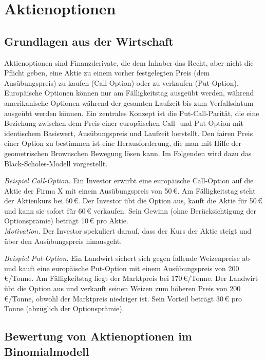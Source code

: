 \section{Aktienoptionen}

\subsection{Grundlagen aus der Wirtschaft}

Aktienoptionen sind Finanzderivate, die dem Inhaber das Recht, aber nicht die Pflicht geben, 
eine Aktie zu einem vorher festgelegten Preis (dem Ausübungspreis) zu kaufen (Call-Option) 
oder zu verkaufen (Put-Option). Europäische Optionen können nur am Fälligkeitstag ausgeübt 
werden, während amerikanische Optionen während der gesamten Laufzeit bis zum Verfallsdatum 
ausgeübt werden können. Ein zentrales Konzept ist die Put-Call-Parität, die eine Beziehung 
zwischen dem Preis einer europäischen Call- und Put-Option mit identischem Basiswert, 
Ausübungspreis und Laufzeit herstellt. Den fairen Preis einer Option zu bestimmen ist eine Herausforderung,
die man mit Hilfe der geometrischen Brownschen Bewegung lösen kann. Im Folgenden wird dazu das Black-Scholes-Modell 
vorgestellt.

\begin{bsp}
\textit{Beispiel Call-Option.} 
Ein Investor erwirbt eine europäische Call-Option auf die Aktie der Firma X mit einem
 Ausübungspreis von 50\,€. Am Fälligkeitstag steht der Aktienkurs bei 60\,€. 
 Der Investor übt die Option aus, kauft die Aktie für 50\,€ und kann 
 sie sofort für 60\,€ verkaufen. Sein Gewinn (ohne Berücksichtigung der Optionsprämie) 
 beträgt 10\,€ pro Aktie.\\
\textit{Motivation.} Der Investor spekuliert darauf, dass der Kurs der Aktie steigt 
und über den Ausübungspreis hinausgeht.

\textit{Beispiel Put-Option.}
Ein Landwirt sichert sich gegen fallende Weizenpreise ab und kauft eine europäische 
Put-Option mit einem Ausübungspreis von 200\,€/Tonne. Am Fälligkeitstag liegt der 
Marktpreis bei 170\,€/Tonne. Der Landwirt übt die Option aus und verkauft seinen 
Weizen zum höheren Preis von 200\,€/Tonne, obwohl der Marktpreis niedriger ist. 
Sein Vorteil beträgt 30\,€ pro Tonne (abzüglich der Optionsprämie).
\end{bsp}
% 
\subsection{Bewertung von Aktienoptionen im Binomialmodell}

